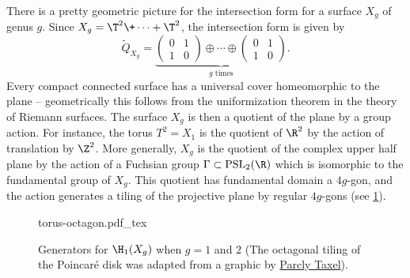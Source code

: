 \begin{example}
	There is a pretty geometric picture for the intersection form for a surface $X_g$ of genus $g$. Since $X_g=\T^2\+\cdots+\T^2$, the intersection form is given by
	\[
		\widetilde{Q}_{X_g} = \underbrace{\begin{pmatrix}0&1\\1&0\end{pmatrix}\oplus\cdots\oplus \begin{pmatrix}0&1\\1&0\end{pmatrix}}_{g\textrm{ times}}.
	\]
	Every compact connected surface has a universal cover homeomorphic to the plane -- geometrically this follows from the uniformization theorem in the theory of Riemann surfaces. The surface $X_g$ is then a quotient of the plane by a group action. For instance, the torus $T^2=X_1$ is the quotient of $\R^2$ by the action of translation by $\Z^2$. More generally, $X_g$ is the quotient of the complex upper half plane by the action of a Fuchsian group $\Gamma\subset \mathrm{PSL}_2(\R)$ which is isomorphic to the fundamental group of $X_g$. This quotient has fundamental domain a $4g$-gon, and the action generates a tiling of the projective plane by regular $4g$-gons (see \cref{fig:torus-octagon}).

	\begin{figure}[ht]
		\centering
		{torus-octagon.pdf_tex}
		\caption{Generators for $\H_1(X_g)$ when $g=1$ and $2$ (The octagonal tiling of the Poincar\'e disk was adapted from a graphic by \href{https://commons.wikimedia.org/wiki/User:Parcly_Taxel}{Parcly Taxel}).}\label{fig:torus-octagon}
	\end{figure}


\end{example}
